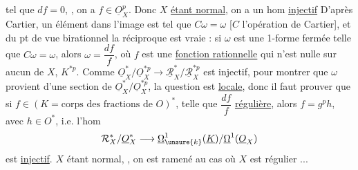 tel que $df=0$, , on a
$f\in\underline O_X^p$.
Donc $X$ \uline{étant normal}, on a un hom \uline{injectif}
D'après Cartier, un élément dans l'image est tel que
$C\omega=\omega$ [$C$ l'opération de Cartier], et du pt de
vue birationnel la réciproque est vraie : si $\omega$ est une
1-forme fermée telle que $C\omega=\omega$, alors $\omega=\dfrac{df}{f}$,
où $f$ est une \uline{fonction rationnelle} qui n'est nulle
sur aucun  de $X$,
 $K^{*p}$.
Comme $\underline O_X^*/\underline O_X^{*p}\longrightarrow
\underline{\mathcal R}_X^*/\underline{\mathcal R}_X^{*p}$ est injectif,
pour montrer que $\omega$ provient d'une section de
$\underline O_X^*/\underline O_X^{*p}$, la question est \uline{locale},
donc il faut prouver que si $f\in(K=\text{corps des fractions de }O)^*$,
telle que $\dfrac{df}{f}$ \uline{régulière}, alors $f=g^p h$, avec $h\in O^*$,
i.e.  l'hom
\[
\mathcal R_X^*/\underline O_X^*\longrightarrow
\underline\Omega^1_{\unsure{k}}(\underline K)/\underline\Omega^1(\underline O_X)
\]
est \uline{injectif}. $X$ étant normal, ,
on est ramené au cas où $X$ est  régulier ...
